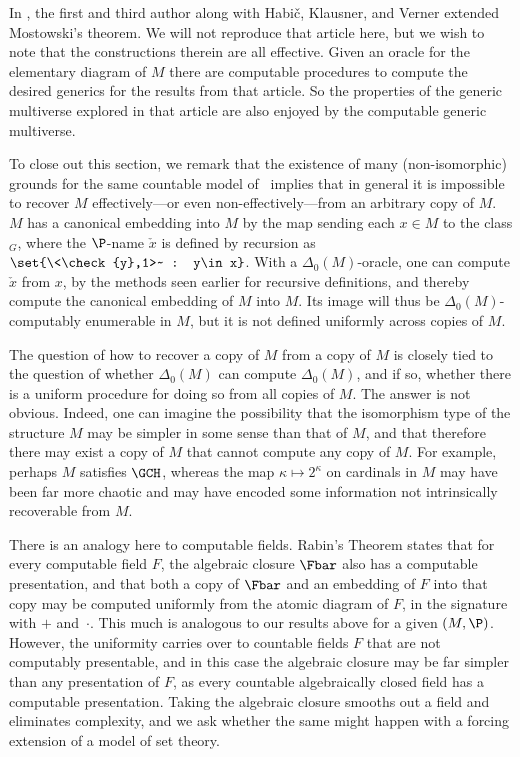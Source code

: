 \documentclass{amsart}
\newcommand{\xcheck}{\check{x}}
\newcommand{\ycheck}{\check{y}}
\begin{document}
 In \cite{HHKVW2019}, the first and third author along with Habi\v{c}, Klausner, and Verner extended Mostowski's theorem. We will not reproduce that article here, but we wish to note that the constructions therein are all effective. Given an oracle for the elementary diagram of $M$ there are computable procedures to compute the desired generics for the results from that article. So the properties of the generic multiverse explored in that article are also enjoyed by the computable generic multiverse.
 \smallskip
 
 To close out this section, we remark that the existence of many (non-isomorphic) grounds for the same countable
 model of \ZFC\ implies that in general it is impossible to recover $M$ effectively---or even non-effectively---from an arbitrary copy of $M$.  $M$ has a canonical embedding into $M$
 by the map sending each $x\in M$ to the class $_G$, where the $\P$-name
 $\xcheck$ is defined by recursion as $\set{\<\ycheck,1>~ : y\in x}$.  With a
 $\Delta_0(M)$-oracle, one can compute $\xcheck$ from $x$, by the methods
 seen earlier for recursive definitions,
 and thereby compute the canonical embedding of $M$ into $M$.
 Its image will thus be $\Delta_0(M)$-computably enumerable in $M$,
 but it is not defined uniformly across copies of $M$.
 
 The question of how to recover a copy of $M$
 from a copy of $M$ is closely tied to the question of whether
 $\Delta_0(M)$ can compute $\Delta_0(M)$, and if so, whether there
 is a uniform procedure for doing so from all copies of $M$.  The answer is not obvious.
 Indeed, one can imagine the possibility that the isomorphism type of the structure
 $M$ may be simpler in some sense than that of $M$, and that therefore
 there may exist a copy of $M$ that cannot compute any copy of $M$.
 For example, perhaps $M$ satisfies $\GCH$, whereas the map
 $\kappa\mapsto 2^{\kappa}$ on cardinals in $M$ may have been far more
 chaotic and may have encoded some information not intrinsically recoverable
 from $M$.
 
 There is an analogy here to computable fields.  Rabin's Theorem states that for
 every computable field $F$, the algebraic closure $\Fbar$ also has a computable
 presentation, and that both a copy of $\Fbar$ and an embedding of $F$ into that copy
 may be computed uniformly from the atomic diagram of $F$, in the signature
 with $+$ and~$\cdot$.  This much is analogous to our results above for a given
 $(M,\P)$.  However, the uniformity carries over to countable fields $F$ that
 are not computably presentable, and in this case the algebraic closure may be
 far simpler than any presentation of $F$, as every countable algebraically closed field
 has a computable presentation.  Taking the algebraic closure smooths out a field
 and eliminates complexity, and we ask whether the same might happen with a forcing extension of a model of set theory.
 
\end{document}
